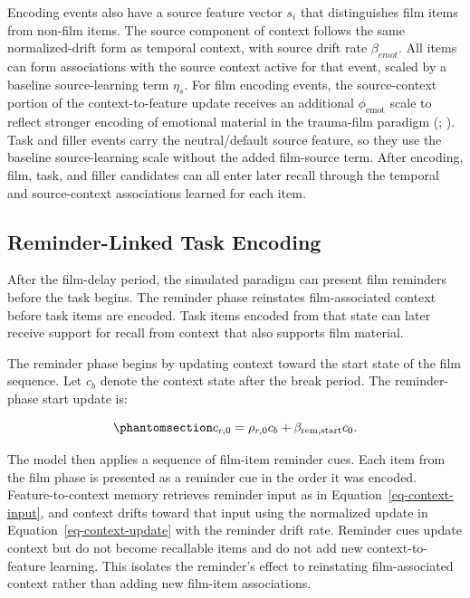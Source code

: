 \documentclass[
  man,
  floatsintext,
  longtable,
  nolmodern,
  notxfonts,
  notimes,
  draftfirst,
  colorlinks=true,linkcolor=blue,citecolor=blue,urlcolor=blue]{apa7}
\begin{document}
Encoding events also have a source feature vector \(s_i\) that
distinguishes film items from non-film items. The source component of
context follows the same normalized-drift form as temporal context, with
source drift rate \(\beta_{emot}\). All items can form associations with
the source context active for that event, scaled by a baseline
source-learning term \(\eta_s\). For film encoding events, the
source-context portion of the context-to-feature update receives an
additional \(\phi_{\mathrm{emot}}\) scale to reflect stronger encoding
of emotional material in the trauma-film paradigm
(;
). Task and filler
events carry the neutral/default source feature, so they use the
baseline source-learning scale without the added film-source term. After
encoding, film, task, and filler candidates can all enter later recall
through the temporal and source-context associations learned for each
item.

\subsection{Reminder-Linked Task
Encoding}\label{reminder-linked-task-encoding}

After the film-delay period, the simulated paradigm can present film
reminders before the task begins. The reminder phase reinstates
film-associated context before task items are encoded. Task items
encoded from that state can later receive support for recall from
context that also supports film material.

The reminder phase begins by updating context toward the start state of
the film sequence. Let \(c_b\) denote the context state after the break
period. The reminder-phase start update is:

\begin{equation}\phantomsection\label{eq-reminder-start-update}{
c_{r,0} = \rho_{r,0} c_b + \beta_{\mathrm{rem,start}} c_0 .
}\end{equation}

The model then applies a sequence of film-item reminder cues. Each item
from the film phase is presented as a reminder cue in the order it was
encoded. Feature-to-context memory retrieves reminder input as in
Equation~\ref{eq-context-input}, and context drifts toward that input
using the normalized update in Equation~\ref{eq-context-update} with the
reminder drift rate. Reminder cues update context but do not become
recallable items and do not add new context-to-feature learning. This
isolates the reminder's effect to reinstating film-associated context
rather than adding new film-item associations.
\end{document}
